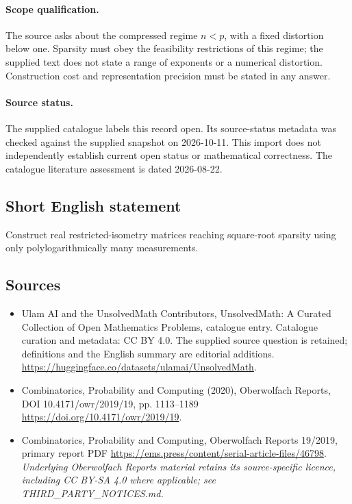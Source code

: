 \documentclass[11pt]{article}
\begin{document}
\paragraph{Scope qualification.}
The source asks about the compressed regime $n<p$, with a fixed distortion below one. Sparsity must obey the feasibility restrictions of this regime; the supplied text does not state a range of exponents or a numerical distortion. Construction cost and representation precision must be stated in any answer.
\paragraph{Source status.}
The supplied catalogue labels this record open. Its source-status metadata was checked against the supplied snapshot on 2026-10-11. This import does not independently establish current open status or mathematical correctness. The catalogue literature assessment is dated 2026-08-22.
\subsection{Short English statement}
Construct real restricted-isometry matrices reaching square-root sparsity using only polylogarithmically many measurements.
\subsection{Sources}
\begin{itemize}
\item[S1] Ulam AI and the UnsolvedMath Contributors, UnsolvedMath: A Curated Collection of Open Mathematics Problems, catalogue entry. Catalogue curation and metadata: CC BY 4.0. The supplied source question is retained; definitions and the English summary are editorial additions.
\url{https://huggingface.co/datasets/ulamai/UnsolvedMath}.
\item[S2] Combinatorics, Probability and Computing (2020), Oberwolfach Reports, DOI 10.4171/owr/2019/19, pp. 1113--1189
\url{https://doi.org/10.4171/owr/2019/19}.
\item[S3] Combinatorics, Probability and Computing, Oberwolfach Reports 19/2019, primary report PDF
\url{https://ems.press/content/serial-article-files/46798}.
\textit{Underlying Oberwolfach Reports material retains its source-specific licence, including CC BY-SA 4.0 where applicable; see THIRD\_PARTY\_NOTICES.md.}
\end{itemize}
\end{document}
